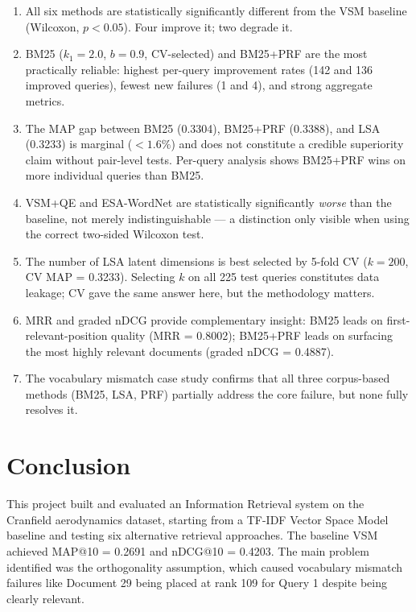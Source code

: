 \documentclass{article}
\begin{document}
\begin{enumerate}[noitemsep]
    \item All six methods are statistically significantly different from the VSM baseline (Wilcoxon, $p < 0.05$). Four improve it; two degrade it.
    \item BM25 ($k_1{=}2.0$, $b{=}0.9$, CV-selected) and BM25+PRF are the most practically reliable: highest per-query improvement rates (142 and 136 improved queries), fewest new failures (1 and 4), and strong aggregate metrics.
    \item The MAP gap between BM25 (0.3304), BM25+PRF (0.3388), and LSA (0.3233) is marginal ($<1.6\%$) and does not constitute a credible superiority claim without pair-level tests. Per-query analysis shows BM25+PRF wins on more individual queries than BM25.
    \item VSM+QE and ESA-WordNet are statistically significantly \emph{worse} than the baseline, not merely indistinguishable --- a distinction only visible when using the correct two-sided Wilcoxon test.
    \item The number of LSA latent dimensions is best selected by 5-fold CV ($k{=}200$, CV MAP = 0.3233). Selecting $k$ on all 225 test queries constitutes data leakage; CV gave the same answer here, but the methodology matters.
    \item MRR and graded nDCG provide complementary insight: BM25 leads on first-relevant-position quality (MRR = 0.8002); BM25+PRF leads on surfacing the most highly relevant documents (graded nDCG = 0.4887).
    \item The vocabulary mismatch case study confirms that all three corpus-based methods (BM25, LSA, PRF) partially address the core failure, but none fully resolves it.
\end{enumerate}

\section{Conclusion}

This project built and evaluated an Information Retrieval system on the Cranfield aerodynamics dataset, starting from a TF-IDF Vector Space Model baseline and testing six alternative retrieval approaches. The baseline VSM achieved MAP@10 = 0.2691 and nDCG@10 = 0.4203. The main problem identified was the orthogonality assumption, which caused vocabulary mismatch failures like Document 29 being placed at rank 109 for Query 1 despite being clearly relevant.
\end{document}
